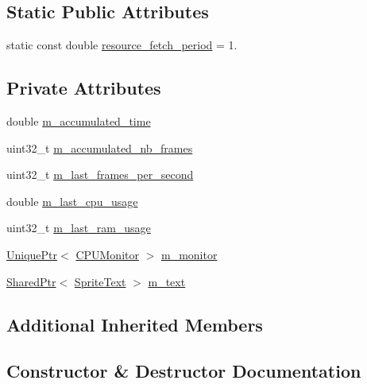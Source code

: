 \subsection*{Static Public Attributes}
\begin{DoxyCompactItemize}
\item 
static const double \hyperlink{classmage_1_1_stats_script_acae1ac4fd880389c88818a8f72cbff2b}{resource\+\_\+fetch\+\_\+period} = 1.
\end{DoxyCompactItemize}
\subsection*{Private Attributes}
\begin{DoxyCompactItemize}
\item 
double \hyperlink{classmage_1_1_stats_script_a55cb25f27b2354983d4e68cb1d4c8fcf}{m\+\_\+accumulated\+\_\+time}
\item 
uint32\+\_\+t \hyperlink{classmage_1_1_stats_script_ac12aaf08707f8de8d88391bcc7f81c53}{m\+\_\+accumulated\+\_\+nb\+\_\+frames}
\item 
uint32\+\_\+t \hyperlink{classmage_1_1_stats_script_afcbbf37839891d06b1331af3cc7f6e82}{m\+\_\+last\+\_\+frames\+\_\+per\+\_\+second}
\item 
double \hyperlink{classmage_1_1_stats_script_ae7dd506d04a4512ae103a1a9c2f9f206}{m\+\_\+last\+\_\+cpu\+\_\+usage}
\item 
uint32\+\_\+t \hyperlink{classmage_1_1_stats_script_a92335c973382a332cf5ce328454fd07b}{m\+\_\+last\+\_\+ram\+\_\+usage}
\item 
\hyperlink{namespacemage_a8c307fbcc33bce9b7f2aa4c26c3b95cf}{Unique\+Ptr}$<$ \hyperlink{classmage_1_1_c_p_u_monitor}{C\+P\+U\+Monitor} $>$ \hyperlink{classmage_1_1_stats_script_a12e321d8fe1003de3643c4b799dd4c8f}{m\+\_\+monitor}
\item 
\hyperlink{namespacemage_a1e01ae66713838a7a67d30e44c67703e}{Shared\+Ptr}$<$ \hyperlink{classmage_1_1_sprite_text}{Sprite\+Text} $>$ \hyperlink{classmage_1_1_stats_script_a35bb45baabf290be684c8b67f30feeb7}{m\+\_\+text}
\end{DoxyCompactItemize}
\subsection*{Additional Inherited Members}


\subsection{Constructor \& Destructor Documentation}
\hypertarget{classmage_1_1_stats_script_a5d2042950a17b62004adead100eb07e1}{}\label{classmage_1_1_stats_script_a5d2042950a17b62004adead100eb07e1} 

